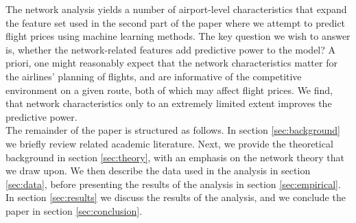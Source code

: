 \par
The network analysis yields a number of airport-level characteristics that expand the feature set used in the second part of the paper where we attempt to predict flight prices using machine learning methods. The key question we wish to answer is, whether the network-related features add predictive power to the model? A priori, one might reasonably expect that the network characteristics matter for the airlines' planning of flights, and are informative of the competitive environment on a given route, both of which may affect flight prices. We find, that network characteristics only to an extremely limited extent improves the predictive power. 
\medskip \\
The remainder of the paper is structured as follows. In section \ref{sec:background} we briefly review related academic literature. Next, we provide the theoretical background in section \ref{sec:theory}, with an emphasis on the network theory that we draw upon. We then describe the data used in the analysis in section \ref{sec:data}, before presenting the results of the analysis in section \ref{sec:empirical}. In section \ref{sec:results} we discuss the results of the analysis, and we conclude the paper in section \ref{sec:conclusion}.
